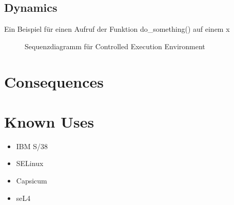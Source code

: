 \subsection{Dynamics}
\begin{samepage}
Ein Beispiel für einen Aufruf der Funktion do\_something() auf einem x
\begin{figure}[H]
  \centering
  
  \caption{Sequenzdiagramm f\"ur Controlled Execution Environment}
\end{figure}
\end{samepage}

\section{Consequences}
\begin{itemize}
\end{itemize}

\section{Known Uses}
\begin{itemize}
\item IBM S/38
\item SELinux
\item Capsicum
\item seL4
\end{itemize}

